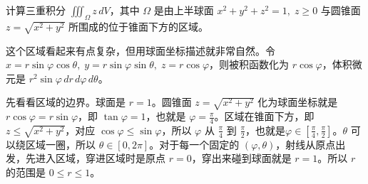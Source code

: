 \begin{myexample}
计算三重积分 \(\iiint_{\Omega} z\,dV\)，其中 \(\Omega\) 是由上半球面 \(x^2+y^2+z^2=1,\; z\ge 0\) 与圆锥面 \(z=\sqrt{x^2+y^2}\) 所围成的位于锥面下方的区域。

这个区域看起来有点复杂，但用球面坐标描述就非常自然。令 \(x=r\sin\varphi\cos\theta,\; y=r\sin\varphi\sin\theta,\; z=r\cos\varphi\)，则被积函数化为 \(r\cos\varphi\)，体积微元是 \(r^2\sin\varphi\,dr\,d\varphi\,d\theta\)。

先看看区域的边界。球面是 \(r=1\)。圆锥面 \(z=\sqrt{x^2+y^2}\) 化为球面坐标就是 \(r\cos\varphi = r\sin\varphi\)，即 \(\tan\varphi=1\)，也就是 \(\varphi=\frac{\pi}{4}\)。区域在锥面下方，即 \(z\le\sqrt{x^2+y^2}\)，对应 \(\cos\varphi\le\sin\varphi\)，所以 \(\varphi\) 从 \(\frac{\pi}{4}\) 到 \(\frac{\pi}{2}\)，也就是\(\varphi\in [\frac{\pi}{4},\frac{\pi}{2}]\)。\(\theta\) 可以绕区域一圈，所以 \(\theta\in [0,2\pi]\)。对于每一个固定的 \((\varphi,\theta)\)，射线从原点出发，先进入区域，穿进区域时是原点 \(r=0\)，穿出来碰到球面就是 \(r=1\)。所以 \(r\) 的范围是 \(0\le r\le 1\)。

\begin{center}
\end{center}
\end{myexample}
